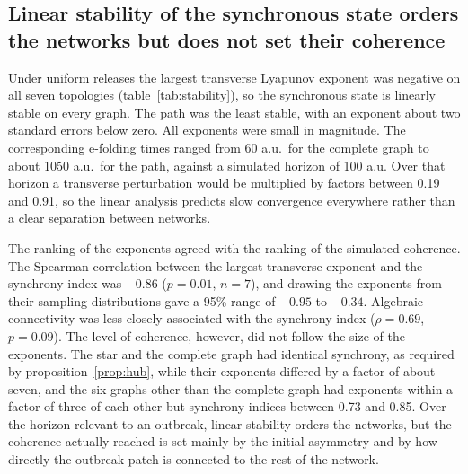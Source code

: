 \subsection{Linear stability of the synchronous state orders the networks but does not set their coherence}
\label{sec:res-stability}

Under uniform releases the largest transverse Lyapunov exponent was negative on all seven topologies (table~\ref{tab:stability}), so the synchronous state is linearly stable on every graph. The path was the least stable, with an exponent about two standard errors below zero. All exponents were small in magnitude. The corresponding e-folding times ranged from 60 a.u.\ for the complete graph to about 1050 a.u.\ for the path, against a simulated horizon of 100 a.u. Over that horizon a transverse perturbation would be multiplied by factors between 0.19 and 0.91, so the linear analysis predicts slow convergence everywhere rather than a clear separation between networks.

The ranking of the exponents agreed with the ranking of the simulated coherence. The Spearman correlation between the largest transverse exponent and the synchrony index was $-0.86$ ($p = 0.01$, $n = 7$), and drawing the exponents from their sampling distributions gave a 95\% range of $-0.95$ to $-0.34$. Algebraic connectivity was less closely associated with the synchrony index ($\rho = 0.69$, $p = 0.09$). The level of coherence, however, did not follow the size of the exponents. The star and the complete graph had identical synchrony, as required by proposition~\ref{prop:hub}, while their exponents differed by a factor of about seven, and the six graphs other than the complete graph had exponents within a factor of three of each other but synchrony indices between 0.73 and 0.85. Over the horizon relevant to an outbreak, linear stability orders the networks, but the coherence actually reached is set mainly by the initial asymmetry and by how directly the outbreak patch is connected to the rest of the network.

